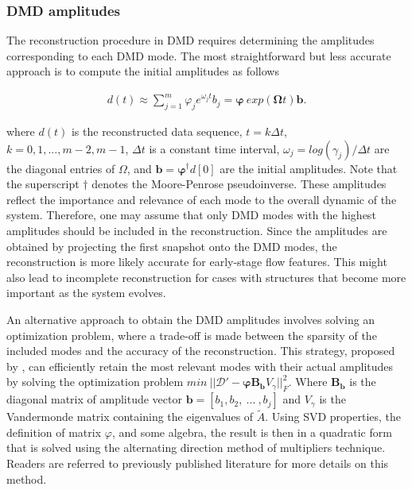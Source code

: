 \documentclass[a4paper,fleqn]{cas-sc}
\begin{document}
	
	\subsubsection{DMD amplitudes}
	\label{DMD amplitudes}
	The reconstruction procedure in DMD requires determining the amplitudes corresponding to each DMD mode. The most straightforward but less accurate approach is to compute the initial amplitudes as follows \cite{Kutz2016}
	
	\begin{align}
		d(t)\approx \sum_{j=1}^{m} \varphi_j e^{\omega_j t} b_j = \boldsymbol{\varphi}~exp (\boldsymbol{\Omega} t)\boldsymbol{b}.
		\label{eq 10}
	\end{align}
	
	\noindent where $d(t)$ is the reconstructed data sequence, $t=k\Delta t$, $k=0, 1, ..., m-2,m-1$, $\Delta t$ is a constant time interval, $\omega _j = log(\gamma_j)/\Delta t$ are the diagonal entries of $\Omega$, and $\boldsymbol{b} = \boldsymbol{\varphi^{\dagger}} d[0]$ are the initial amplitudes. Note that the superscript $\dagger$ denotes the Moore-Penrose pseudoinverse. These amplitudes reflect the importance and relevance of each mode to the overall dynamic of the system. Therefore, one may assume that only DMD modes with the highest amplitudes should be included in the reconstruction. Since the amplitudes are obtained by projecting the first snapshot onto the DMD modes, the reconstruction is more likely accurate for early-stage flow features. This might also lead to incomplete reconstruction for cases with structures that become more important as the system evolves. 
	
	An alternative approach to obtain the DMD amplitudes involves solving an optimization problem, where a trade-off is made between the sparsity of the included modes and the accuracy of the reconstruction. This strategy, proposed by \citet{Jovanovic2014}, can efficiently retain the most relevant modes with their actual amplitudes by solving the optimization problem $min~||\boldsymbol{\mathcal{D}'} - \boldsymbol{\varphi} \boldsymbol{B_b} V_\gamma||_F^2$. Where $\boldsymbol{B_b}$ is the diagonal matrix of amplitude vector $\boldsymbol{b} = [b_1,  b_2,~...~,b_j]$ and $V_\gamma$ is the Vandermonde matrix containing the eigenvalues of $\tilde{A}$.  Using SVD properties, the definition of matrix $\varphi$, and some algebra, the result is then in a quadratic form that is solved using the alternating direction method of multipliers technique. Readers are referred to previously published literature \cite{Jovanovic2014,Schmid2023} for more details on this method. 
	
\end{document}
